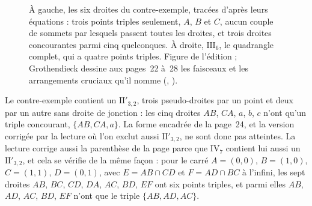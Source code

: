 \begin{figure}[htbp]
\centering
{}
\caption{À gauche, les six droites du contre-exemple, tracées d'après leurs équations : trois points triples seulement, $A$, $B$ et $C$, aucun couple de sommets par lesquels passent toutes les droites, et trois droites concourantes parmi cinq quelconques. À droite, $\mathrm{III}_6$, le quadrangle complet, qui a quatre points triples. Figure de l'édition ; Grothendieck dessine aux pages~22 à~28 les faisceaux et les arrangements cruciaux qu'il nomme (, ).}
\label{fig:80-contre-exemple}
\end{figure}

\begin{remarque}
Le contre-exemple contient un $\mathrm{II}'_{3,2}$, trois pseudo-droites par un point et deux par un autre sans droite de jonction : les cinq droites $AB$, $CA$, $a$, $b$, $c$ n'ont qu'un triple concourant, $\{AB, CA, a\}$. La forme encadrée de la page~24, et la version corrigée par la lecture où l'on exclut aussi $\mathrm{II}'_{3,2}$, ne sont donc pas atteintes. La lecture corrige aussi la parenthèse de la page parce que $\mathrm{IV}_7$ contient lui aussi un $\mathrm{II}'_{3,2}$, et cela se vérifie de la même façon : pour le carré $A = (0, 0)$, $B = (1, 0)$, $C = (1, 1)$, $D = (0, 1)$, avec $E = AB \cap CD$ et $F = AD \cap BC$ à l'infini, les sept droites $AB$, $BC$, $CD$, $DA$, $AC$, $BD$, $EF$ ont six points triples, et parmi elles $AB$, $AD$, $AC$, $BD$, $EF$ n'ont que le triple $\{AB, AD, AC\}$.
\end{remarque}

